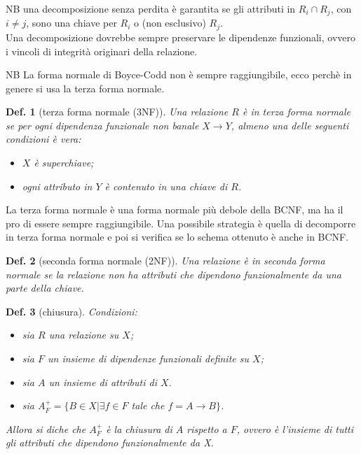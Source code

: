 \documentclass{article}
\newtheorem{definition}{Def.}[section]
\begin{document}
NB una decomposizione senza perdita è garantita se gli attributi in $R_i \cap
R_j$, con $i \neq j$, sono una chiave per $R_i$ o (non esclusivo) $R_j$.\\
Una decomposizione dovrebbe sempre preservare le dipendenze funzionali, ovvero i
vincoli di integrità originari della relazione.

NB La forma normale di Boyce-Codd non è sempre raggiungibile, ecco perchè in
genere si usa la terza forma normale.

\begin{definition}[terza forma normale (3NF)]
	Una relazione $R$ è in terza forma normale se per ogni dipendenza funzionale 
	non banale $X \rightarrow Y$, almeno una delle seguenti condizioni è vera:
	\begin{itemize}
		\item $X$ è superchiave;

		\item ogni attributo in $Y$ è contenuto in una chiave di $R$.
	\end{itemize}
\end{definition}

La terza forma normale è una forma normale più debole della BCNF, ma ha il pro
di essere sempre raggiungibile. Una possibile strategia è quella di decomporre
in terza forma normale e poi si verifica se lo schema ottenuto è anche in BCNF.

\begin{definition}[seconda forma normale (2NF)]
	Una relazione è in seconda forma normale se la relazione non ha attributi 
	che dipendono funzionalmente da una parte della chiave.
\end{definition}

\begin{definition}[chiusura]
	Condizioni:
	\begin{itemize}
		\item sia $R$ una relazione su $X$;

		\item sia $F$ un insieme di dipendenze funzionali definite su $X$;

		\item sia $A$ un insieme di attributi di $X$.

		\item sia $A^+_F = \{B \in X | \exists f \in F $ tale che $ f =A 
			\rightarrow B\}$.
	\end{itemize}

	Allora si diche che $A^+_F$ è la chiusura di $A$ rispetto a $F$, ovvero è
	l'insieme di tutti gli attributi che dipendono funzionalmente da X.
\end{definition}
\end{document}
